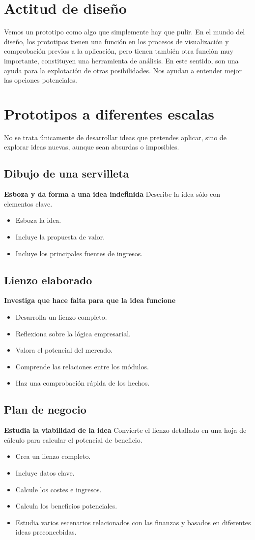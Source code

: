 \documentclass[11pt]{book}
\begin{document}
\section{Actitud de diseño}
Vemos un prototipo como algo que simplemente hay que pulir. En el mundo del diseño, los prototipos tienen una función en los procesos de visualización y comprobación previos a la aplicación, pero tienen también otra función muy importante, constituyen una herramienta de análisis. En este sentido, son una ayuda para la explotación de otras posibilidades. Nos ayudan a entender mejor las opciones potenciales.
\section{Prototipos a diferentes escalas}
No se trata únicamente de desarrollar ideas que pretendes aplicar, sino de explorar ideas nuevas, aunque sean absurdas o imposibles.
\subsection{Dibujo de una servilleta}
\textbf{Esboza y da forma a una idea indefinida}
Describe la idea sólo con elementos clave.
\begin{itemize}
\item Esboza la idea.
\item Incluye la propuesta de valor.
\item Incluye los principales fuentes de ingresos.
\end{itemize}
\subsection{Lienzo elaborado}
\textbf{Investiga que hace falta para que la idea funcione}
\begin{itemize}
\item Desarrolla un lienzo completo.
\item Reflexiona sobre la lógica empresarial.
\item Valora el potencial del mercado.
\item Comprende las relaciones entre los módulos.
\item Haz una comprobación rápida de los hechos.
\end{itemize}
\subsection{Plan de negocio}
\textbf{Estudia la viabilidad de la idea}
Convierte el lienzo detallado en una hoja de cálculo para calcular el potencial de beneficio.
\begin{itemize}
\item Crea un lienzo completo.
\item Incluye datos clave.
\item Calcule los costes e ingresos.
\item Calcula los beneficios potenciales.
\item Estudia varios escenarios relacionados con las finanzas y basados en diferentes ideas preconcebidas. 
\end{itemize}
\end{document}
